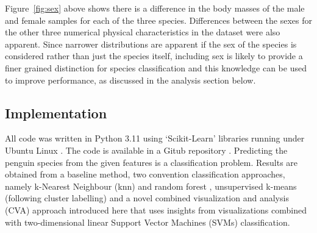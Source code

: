 \documentclass[12pt]{article}
\begin{document}
Figure~\ref{fig:sex} above shows there is a difference in the body masses of the male and female samples for each of the three species. 
Differences between the sexes for the other three numerical physical characteristics in the dataset were also apparent. 
Since narrower distributions are apparent if the sex of the species is considered rather than just the species itself, 
including sex is likely to provide a finer grained distinction for species classification 
and this knowledge can be used to improve performance, as discussed in the analysis section below. 

\subsection*{Implementation}

All code was written in Python 3.11 \cite{python311} using ‘Scikit-Learn’ libraries \cite{scikit-learn} running under Ubuntu Linux \cite{ubuntu}. 
The code is available in a Gitub repository \cite{TimAIRepo}. Predicting the penguin species from the given features is a classification problem. 
Results are obtained from a baseline method, two convention classification approaches, 
namely k-Nearest Neighbour (knn) \cite{bishop2006pattern} and random forest \cite{breiman2001random}, 
unsupervised k-means (following cluster labelling) \cite{tan2005introduction} and a novel combined visualization and analysis (CVA) approach 
introduced here that uses insights from visualizations combined with two-dimensional linear Support Vector Machines (SVMs) classification.
\end{document}
